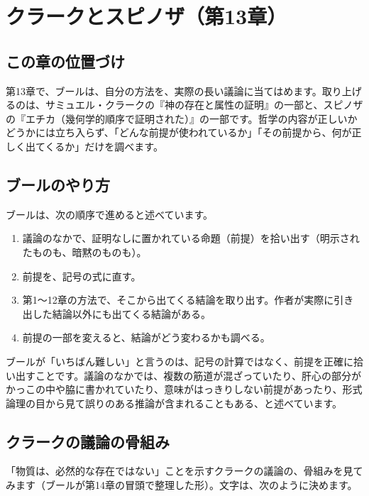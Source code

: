 \documentclass[a4paper,11pt,openany]{ltjsbook}
\begin{document}
\chapter{クラークとスピノザ（第13章）}

\section{この章の位置づけ}

第13章で、ブールは、自分の方法を、実際の長い議論に当てはめます。取り上げるのは、サミュエル・クラークの『神の存在と属性の証明』の一部と、スピノザの『エチカ（幾何学的順序で証明された）』の一部です。哲学の内容が正しいかどうかには立ち入らず、「どんな前提が使われているか」「その前提から、何が正しく出てくるか」だけを調べます。

\section{ブールのやり方}

ブールは、次の順序で進めると述べています。

\begin{enumerate}[leftmargin=*]
\item 議論のなかで、証明なしに置かれている命題（前提）を拾い出す（明示されたものも、暗黙のものも）。
\item 前提を、記号の式に直す。
\item 第1〜12章の方法で、そこから出てくる結論を取り出す。作者が実際に引き出した結論以外にも出てくる結論がある。
\item 前提の一部を変えると、結論がどう変わるかも調べる。
\end{enumerate}

ブールが「いちばん難しい」と言うのは、記号の計算ではなく、前提を正確に拾い出すことです。議論のなかでは、複数の筋道が混ざっていたり、肝心の部分がかっこの中や脇に書かれていたり、意味がはっきりしない前提があったり、形式論理の目から見て誤りのある推論が含まれることもある、と述べています。

\section{クラークの議論の骨組み}

「物質は、必然的な存在ではない」ことを示すクラークの議論の、骨組みを見てみます（ブールが第14章の冒頭で整理した形）。文字は、次のように決めます。
\end{document}
